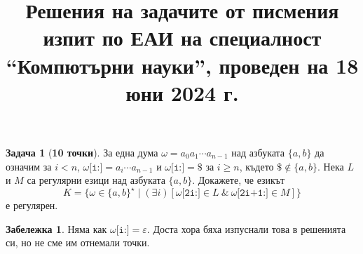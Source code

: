 \documentclass{article}
\theoremstyle{definition}
\newtheorem{problem}{Задача}
\newtheorem*{remark}{Забележка}
\begin{document}
\title{Решения на задачите от писмения изпит по ЕАИ на специалност ``Компютърни науки'', проведен на 18 юни 2024 г.}
\date{}

\newcommand{\N}{\mathbb{N}}
\newcommand{\A}{\mathcal{A}}
\newcommand{\calL}{\mathcal{L}}
\newcommand{\cnt}{\operatorname{Count}}
\newcommand{\tri}[1]{\stackrel{#1}{\vartriangleleft}}


\maketitle

\begin{problem}[{\bf 10 точки}]
За една дума $\omega = a_0 a_1 \cdots a_{n - 1}$ над азбуката $\{a,b\}$
да означим за $i < n$, $\omega\texttt{[i:]} = a_i\cdots a_{n-1}$
и $\omega\texttt{[i:]} = \$$ за $i \geq n$, където $\$\not\in \{a,b\}$.
    Нека $L$ и $M$ са регулярни езици над азбуката $\{a,b\}$.
Докажете, че езикът
\[
    K = \{ \omega \in \{a,b\}^\star \mid (\exists i) [\omega\texttt{[2i:]} \in L\ \&\ \omega\texttt{[2i+1:]} \in M] \}
\]
е регулярен.
\end{problem}

\begin{remark}
    Няма как $\omega\texttt{[i:]} = \varepsilon$.
    Доста хора бяха изпуснали това в решенията си, но не сме им отнемали точки.
\end{remark}
\end{document}
